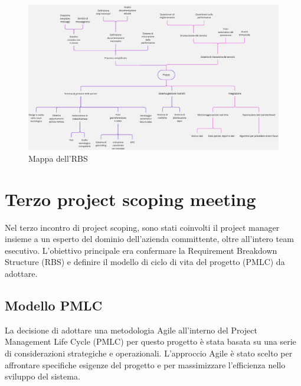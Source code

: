 \documentclass[a4paper,12pt, openright]{report}
\begin{document}
\begin{figure}[htp]
    \centering    \includegraphics[height=1.0\textwidth,width=1.4\textwidth,angle=-90,origin=c]{img/RBS_map.jpg}
    \caption{Mappa dell'RBS}
    \label{fig:rbs_map}
\end{figure}

\clearpage

\section{Terzo project scoping meeting}
Nel terzo incontro di project scoping, sono stati coinvolti il project manager insieme a un esperto del dominio dell’azienda committente,
oltre all’intero team esecutivo. L'obiettivo principale era confermare la Requirement Breakdown Structure (RBS) e definire il modello di ciclo di vita del progetto (PMLC) da adottare.

\subsection{Modello PMLC}
La decisione di adottare una metodologia Agile all'interno del Project Management Life Cycle (PMLC) per questo progetto è stata basata su una serie di considerazioni strategiche e operazionali. L'approccio Agile è stato scelto per affrontare specifiche esigenze del progetto e per massimizzare l'efficienza nello sviluppo del sistema. 
\end{document}
